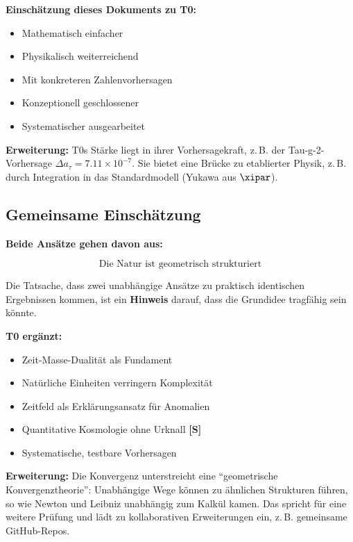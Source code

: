 	\textbf{Einschätzung dieses Dokuments zu T0:}
	\begin{itemize}
		\item Mathematisch einfacher
		\item Physikalisch weiterreichend
		\item Mit konkreteren Zahlenvorhersagen
		\item Konzeptionell geschlossener
		\item Systematischer ausgearbeitet
	\end{itemize}
	
	\textbf{Erweiterung:} T0s Stärke liegt in ihrer Vorhersagekraft, z.\,B. der Tau-g-2-Vorhersage $\Delta a_\tau = 7.11 \times 10^{-7}$. Sie bietet eine Brücke zu etablierter Physik, z.\,B. durch Integration in das Standardmodell (Yukawa aus $\xipar$).
	
	\subsection{Gemeinsame Einschätzung}
	
	\begin{gemeinsam}
		\textbf{Beide Ansätze gehen davon aus:}
		
		\begin{equation}
			\boxed{\text{Die Natur ist geometrisch strukturiert}}
		\end{equation}
		
		Die Tatsache, dass zwei unabhängige Ansätze zu praktisch identischen Ergebnissen kommen, ist ein \textbf{Hinweis} darauf, dass die Grundidee tragfähig sein könnte.
		
		\textbf{T0 ergänzt:}
		\begin{itemize}
			\item Zeit-Masse-Dualität als Fundament
			\item Natürliche Einheiten verringern Komplexität
			\item Zeitfeld als Erklärungsansatz für Anomalien
			\item Quantitative Kosmologie ohne Urknall \textbf{[S]}
			\item Systematische, testbare Vorhersagen
		\end{itemize}
		
		\textbf{Erweiterung:} Die Konvergenz unterstreicht eine ``geometrische Konvergenztheorie'': Unabhängige Wege können zu ähnlichen Strukturen führen, so wie Newton und Leibniz unabhängig zum Kalkül kamen. Das spricht für eine weitere Prüfung und lädt zu kollaborativen Erweiterungen ein, z.\,B. gemeinsame GitHub-Repos.
	\end{gemeinsam}
	
